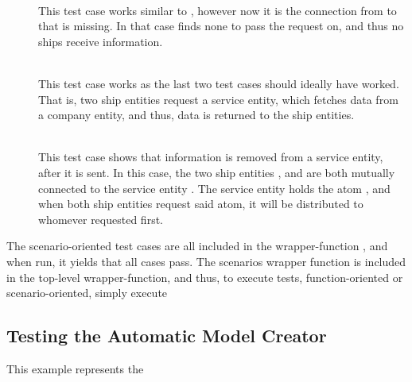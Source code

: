 \begin{description}
  \item[]\ \\
    This test case works similar to , however now it is the connection from  to  that is missing. In that case  finds none to pass the request on, and thus no ships receive information.
  \item[]\ \\
    This test case works as the last two test cases should ideally have worked. That is, two ship entities request a service entity, which fetches data from a company entity, and thus, data is returned to the ship entities.
  \item[]\ \\
    This test case shows that information is removed from a service entity, after it is sent. In this case, the two ship entities , and  are both mutually connected to the service entity . The service entity holds the atom , and when both ship entities request said atom, it will be distributed to whomever requested first. 
\end{description}

The scenario-oriented test cases are all included in the wrapper-function , and when run, it yields that all cases pass. The scenarios wrapper function is included in the top-level wrapper-function, and thus, to execute  tests, function-oriented or scenario-oriented, simply execute 

\subsection{Testing the Automatic Model Creator}

This example represents the 

